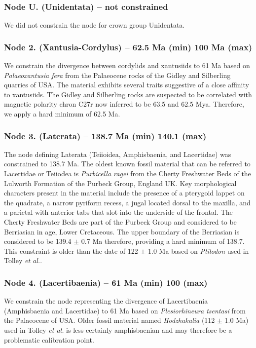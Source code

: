 \documentclass[a4paper, 12pt]{article}
\begin{document}
\subsubsection*{Node U. (Unidentata) – not constrained}
We did not constrain the node for crown group Unidentata.
 
\subsubsection*{Node 2. (Xantusia-Cordylus) – 62.5 Ma (min) 100 Ma (max)}
We constrain the divergence between cordylids and xantusiids to 61 Ma based on \textit{Palaeoxantusia fera} from the Palaeocene rocks of the Gidley and Silberling quarries of USA\cite{hecht1956new,sullivan1991paleocene}. The material exhibits several traits suggestive of a close affinity to xantusiids\cite{smith2009eocene,smith2011long}. The Gidley and Silberling rocks are suspected to be correlated with magnetic polarity chron C27r\cite{butler1987magnetic} now inferred to be 63.5 and 62.5 Mya\cite{gradstein2012geologic,dinares2014astronomical,ogg2020geomagnetic}. Therefore, we apply a hard minimum of 62.5 Ma.

\subsubsection*{Node 3. (Laterata) – 138.7 Ma (min) 140.1 (max)}
The node defining Laterata (Teiioidea, Amphisbaenia, and Lacertidae) was constrained to 138.7 Ma. The oldest known fossil material that can be referred to Lacertidae or Teiiodea is \textit{Purbicella ragei} from the Cherty Freshwater Beds of the Lulworth Formation of the Purbeck Group, England UK\cite{evans2012new}. Key morphological characters present in the material include the presence of a pterygoid lappet on the quadrate, a narrow pyriform recess, a jugal located dorsal to the maxilla, and a parietal with anterior tabs that slot into the underside of the frontal\cite{conrad2008phylogeny,evans2008skull}. The Cherty Freshwater Beds are part of the Purbeck Group and considered to be Berriasian in age, Lower Cretaceous\cite{radley2012wealden}. The upper boundary of the Berriasian is considered to be 139.4 $\pm$ 0.7 Ma\cite{gradstein2012geologic} therefore, providing a hard minimum of 138.7. This constraint is older than the date of 122 $\pm$ 1.0 Ma based on \textit{Ptilodon}\cite{nydam2002lizards,winkler1990early} used in Tolley \textit{et al.}\cite{tolley2013large}.
  
\subsubsection*{Node 4. (Lacertibaenia) – 61 Ma (min) 100 (max)}
We constrain the node representing the divergence of Lacertibaenia (Amphisbaenia and Lacertidae) to 61 Ma based on \textit{Plesiorhineura tsentasi} from the Palaeocene of USA\cite{sullivan1985new}. Older fossil material named \textit{Hodzhakulia} (112 $\pm$ 1.0 Ma) used in Tolley \textit{et al.}\cite{tolley2013large} is less certainly amphisbaenian and may therefore be a problematic calibration point\cite{hipsley2009integration}.
 
\end{document}

